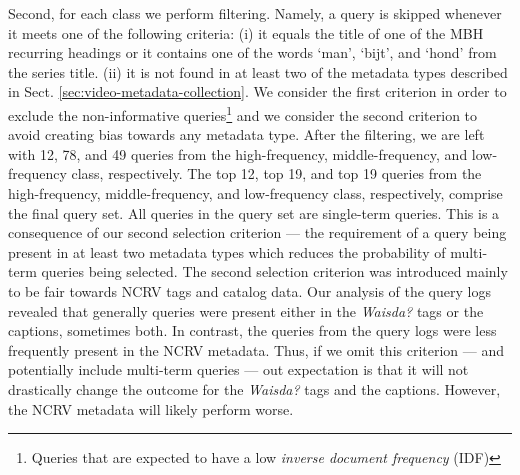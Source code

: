 Second, for each class we perform filtering. Namely, a query is skipped whenever it meets one of the following criteria: (i) it equals the title of one of the MBH recurring headings or it contains one of the words `man', `bijt', and `hond' from the series title. (ii)  it is not found in at least two of the metadata types described in Sect. \ref{sec:video-metadata-collection}. We consider the first criterion in order to exclude the non-informative queries\footnote{Queries that are expected to have a low \textit{inverse document frequency} (IDF)} and we consider the second criterion to avoid creating bias towards any metadata type. After the filtering, we are left with 12, 78, and 49 queries from the high-frequency, middle-frequency, and low-frequency class, respectively.
The top 12, top 19, and top 19 queries from the high-frequency, middle-frequency, and low-frequency class, respectively, comprise the final query set. All queries in the query set are single-term queries. This is a consequence of our second selection criterion --- the requirement of a query being present in at least two metadata types which reduces the probability of multi-term queries being selected. The second selection criterion was introduced mainly to be fair towards NCRV tags and catalog data. Our analysis of the query logs revealed that generally queries were present either in the \textit{Waisda?} tags or the captions, sometimes both. In contrast, the queries from the query logs were less frequently present in the NCRV metadata. Thus, if we omit this criterion --- and potentially include multi-term queries --- out expectation is that it will not drastically change the outcome for the \textit{Waisda?} tags and the captions. However, the NCRV metadata will likely perform worse.

